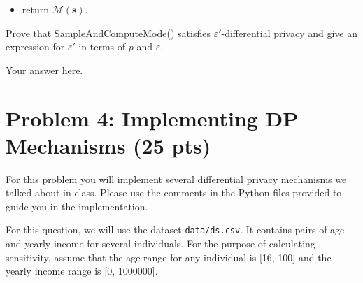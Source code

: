 \documentclass[11pt,letterpaper]{article}
\newenvironment{answer}{\em \color{blue} \begin{adjustwidth}{1cm}{1cm}}{\end{adjustwidth}}
\newcommand{\mc}[1]{\mathcal{#1}}	%
\newcommand{\rv}[1]{\mathbf{#1}}    %
\begin{document}
\begin{enumerate}
{{\begin{itemize}[nolistsep,noitemsep]
	\item return $\mc{M}(\rv{s})$.
\end{itemize} }}%
	\medskip
	
	\noindent Prove that \textsf{SampleAndComputeMode()} satisfies $\varepsilon'$-differential privacy and give an expression for $\varepsilon'$ in terms of $p$ and $\varepsilon$.
	
	\begin{answer}
	
		Your answer here.
		
	\end{answer}
%
\end{enumerate}


\newpage
\section*{Problem 4: Implementing DP Mechanisms (25 pts)}
%
For this problem you will implement several differential privacy mechanisms we talked about in class. Please use the comments in the Python files provided to guide you in the implementation. 

For this question, we will use the dataset \texttt{data/ds.csv}. It contains pairs of age and yearly income for several individuals. For the purpose of calculating sensitivity, assume that the age range for any individual is [16, 100] and the yearly income range is [0, 1000000].
\end{document}
